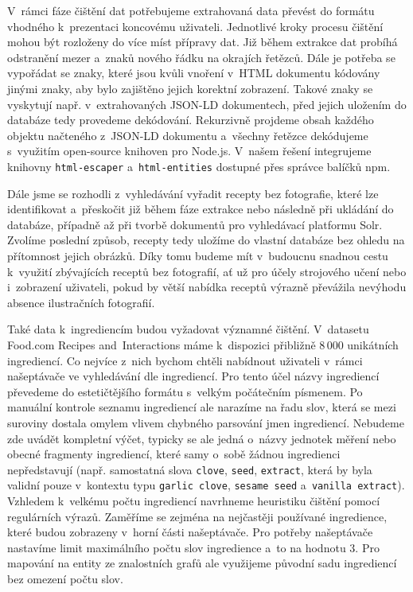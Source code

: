 V~rámci fáze čištění dat potřebujeme extrahovaná data převést do formátu vhodného k~prezentaci koncovému uživateli. Jednotlivé kroky procesu čištění mohou být rozloženy do více míst přípravy dat. Již během extrakce dat probíhá odstranění mezer a~znaků nového řádku na okrajích řetězců. Dále je potřeba se vypořádat se znaky, které jsou kvůli vnoření v~HTML dokumentu kódovány jinými znaky, aby bylo zajištěno jejich korektní zobrazení. Takové znaky se vyskytují např. v~extrahovaných JSON-LD dokumentech, před jejich uložením do databáze tedy provedeme dekódování. Rekurzivně projdeme obsah každého objektu načteného z~JSON-LD dokumentu a~všechny řetězce dekódujeme s~využitím open-source knihoven pro Node.js. V~našem řešení integrujeme knihovny \texttt{html-escaper} a~\texttt{html-entities} dostupné přes správce balíčků npm.

Dále jsme se rozhodli z~vyhledávání vyřadit recepty bez fotografie, které lze identifikovat a~přeskočit již během fáze extrakce nebo následně při ukládání do databáze, případně až při tvorbě dokumentů pro vyhledávací platformu Solr. Zvolíme poslední způsob, recepty tedy uložíme do vlastní databáze bez ohledu na přítomnost jejich obrázků. Díky tomu budeme mít v~budoucnu snadnou cestu k~využití zbývajících receptů bez fotografií, ať už pro účely strojového učení nebo i~zobrazení uživateli, pokud by větší nabídka receptů výrazně převážila nevýhodu absence ilustračních fotografií.

Také data k~ingrediencím budou vyžadovat významné čištění. V~datasetu Food.com Recipes and~Interactions máme k~dispozici přibližně $8\,000$ unikátních ingrediencí. Co nejvíce z~nich bychom chtěli nabídnout uživateli v~rámci našeptávače ve vyhledávání dle ingrediencí. Pro tento účel názvy ingrediencí převedeme do estetičtějšího formátu s~velkým počátečním písmenem. Po manuální kontrole seznamu ingrediencí ale narazíme na řadu slov, která se mezi suroviny dostala omylem vlivem chybného parsování jmen ingrediencí. Nebudeme zde uvádět kompletní výčet, typicky se ale jedná o~názvy jednotek měření nebo obecné fragmenty ingrediencí, které samy o~sobě žádnou ingredienci nepředstavují (např. samostatná slova \texttt{clove}, \texttt{seed}, \texttt{extract}, která by byla validní pouze v~kontextu typu \texttt{garlic clove}, \texttt{sesame seed} a~\texttt{vanilla extract}). Vzhledem k~velkému počtu ingrediencí navrhneme heuristiku čištění pomocí regulárních výrazů. Zaměříme se zejména na nejčastěji používané ingredience, které budou zobrazeny v~horní části našeptávače. Pro potřeby našeptávače nastavíme limit maximálního počtu slov ingredience a~to na hodnotu $3$. Pro mapování na entity ze znalostních grafů ale využijeme původní sadu ingrediencí bez omezení počtu slov.

